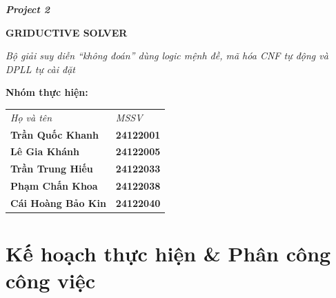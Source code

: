 \documentclass{article}
\begin{document}
\begin{titlepage}
\begin{flushleft}
    \fontsize{15pt}{13pt}\selectfont
    \textbf{\textsl{Project 2}}
\end{flushleft}

\begin{center}
    {\fontsize{24pt}{28pt}\selectfont\textbf{\textcolor{primarycolor}{GRIDUCTIVE SOLVER}}}

    \vspace{4pt}
    {\normalsize\textit{Bộ giải suy diễn ``không đoán'' dùng logic mệnh đề, mã hóa CNF tự động và DPLL tự cài đặt}}
\end{center}

\vspace{10pt}
\begin{center}
    \textbf{Nhóm thực hiện:}
    \vspace{1pt}

    \renewcommand{\arraystretch}{1.3}
    {\small
    \begin{tabular}{l @{\hspace{1.5cm}} l}
        \textit{\small Họ và tên} & \textit{\small MSSV} \\
        \textbf{Trần Quốc Khanh}    & \textbf{24122001} \\
        \textbf{Lê Gia Khánh}       & \textbf{24122005} \\
        \textbf{Trần Trung Hiếu}    & \textbf{24122033} \\
        \textbf{Phạm Chấn Khoa}     & \textbf{24122038} \\
        \textbf{Cái Hoàng Bảo Kin}  & \textbf{24122040} \\
    \end{tabular}
    }
\end{center}
\end{titlepage}
\hypersetup{pageanchor=true}

\tableofcontents
\newpage

\section{Kế hoạch thực hiện \& Phân công công việc}
\end{document}
